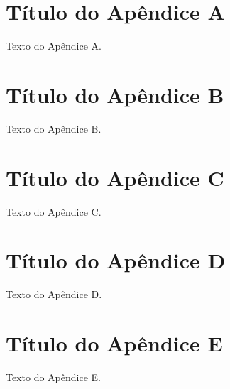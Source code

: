
\begin{apendicesenv}
	
	\partapendices
	
	\chapter{Título do Apêndice A}
	
	Texto do Apêndice A.
	
	
	
	\chapter{Título do Apêndice B}
	
	Texto do Apêndice B.
	
	
	
	\chapter{Título do Apêndice C}
	
	Texto do Apêndice C.
	
	
	
	\chapter{Título do Apêndice D}
	
	Texto do Apêndice D.
	
	
	
	\chapter{Título do Apêndice E}
	
	Texto do Apêndice E.
	
	
	
\end{apendicesenv}